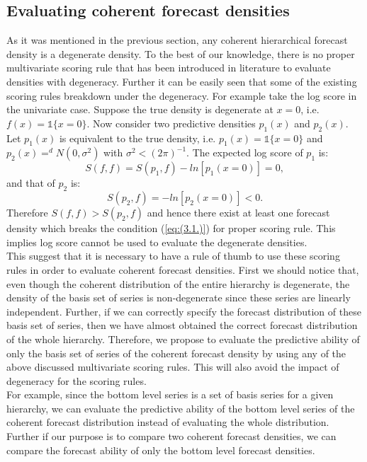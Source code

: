 \documentclass[a4paper, 11pt]{article}
\begin{document}
\subsection{Evaluating coherent forecast densities}

As it was mentioned in the previous section, any coherent hierarchical forecast density is a degenerate density. To the best of our knowledge, there is no proper multivariate scoring rule that has been introduced in literature to evaluate densities with degeneracy. Further it can be easily seen that some of the existing scoring rules breakdown under the degeneracy. For example take the log score in the univariate case. Suppose the true density is degenerate at $x=0$, i.e. $f(x)=\mathbb{1}\{x=0\}$.  Now consider two predictive densities $p_1(x)$ and $p_2(x)$. Let $p_1(x)$ is equivalent to the true density, i.e. $p_1(x)=\mathbb{1}\{x=0\}$ and $p_2(x) =^d N(0,\sigma^2)$ with $\sigma^2 < (2\pi)^{-1}$. The expected log score of $p_1$ is:
$$S(f,f) = S(p_1,f) -ln[p_1(x=0)]=0,$$
\noindent
and that of $p_2$ is:
$$S(p_2,f) = -ln[p_2(x=0)]<0.$$ 
\noindent
Therefore $S(f,f) > S(p_2,f)$ and hence there exist at least one forecast density which breaks the condition (\ref{eq:(3.1.)}) for proper scoring rule. This implies log score cannot be used to evaluate the degenerate densities.  \\

\noindent
This suggest that it is necessary to have a rule of thumb to use these scoring rules in order to evaluate coherent forecast densities. First we should notice that, even though the coherent distribution of the entire hierarchy is degenerate, the density of the basis set of series is non-degenerate since these series are linearly independent. Further, if we can correctly specify the forecast distribution of these basis set of series, then we have almost obtained the correct forecast distribution of the whole hierarchy. Therefore, we propose to evaluate the predictive ability of only the basis set of series of the coherent forecast density by using any of the above discussed multivariate scoring rules. This will also avoid the impact of degeneracy for the scoring rules. \\

\noindent
For example, since the bottom level series is a set of basis series for a given hierarchy, we can evaluate the predictive ability of the bottom level series of the coherent forecast distribution instead of evaluating the whole distribution. Further if our purpose is to compare two coherent forecast densities, we can compare the forecast ability of only the bottom level forecast densities. 
\end{document}
